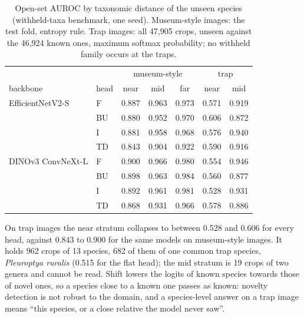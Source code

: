 \begin{table}[htb]
    \centering
    \caption{Open-set AUROC by taxonomic distance of the unseen species (withheld-taxa benchmark, one seed). Museum-style images: the test fold, entropy rule. Trap images: all 47,905 crops, unseen against the 46,924 known ones, maximum softmax probability; no withheld family occurs at the traps.}
    \label{tab:openset_distance}
    \begin{tabular}{llccccc}
        \toprule
        & & \multicolumn{3}{c}{museum-style} & \multicolumn{2}{c}{trap} \\
        backbone & head & near & mid & far & near & mid \\
        \midrule
        EfficientNetV2-S & F & 0.887 & 0.963 & 0.973 & 0.571 & 0.919 \\
        & BU & 0.880 & 0.952 & 0.970 & 0.606 & 0.872 \\
        & I & 0.881 & 0.958 & 0.968 & 0.576 & 0.940 \\
        & TD & 0.843 & 0.904 & 0.922 & 0.590 & 0.916 \\
        DINOv3 ConvNeXt-L & F & 0.900 & 0.966 & 0.980 & 0.554 & 0.946 \\
        & BU & 0.898 & 0.963 & 0.984 & 0.560 & 0.877 \\
        & I & 0.892 & 0.961 & 0.981 & 0.528 & 0.931 \\
        & TD & 0.868 & 0.931 & 0.966 & 0.578 & 0.886 \\
        \bottomrule
    \end{tabular}
\end{table}

On trap images the near stratum collapses to between 0.528 and 0.606 for every head, against 0.843 to 0.900 for the same models on museum-style images.
It holds 962 crops of 13 species, 682 of them of one common trap species, \textit{Pleuroptya ruralis} (0.515 for the flat head); the mid stratum is 19 crops of two genera and cannot be read.
Shift lowers the logits of known species towards those of novel ones, so a species close to a known one passes as known: novelty detection is not robust to the domain, and a species-level answer on a trap image means ``this species, or a close relative the model never saw''.
